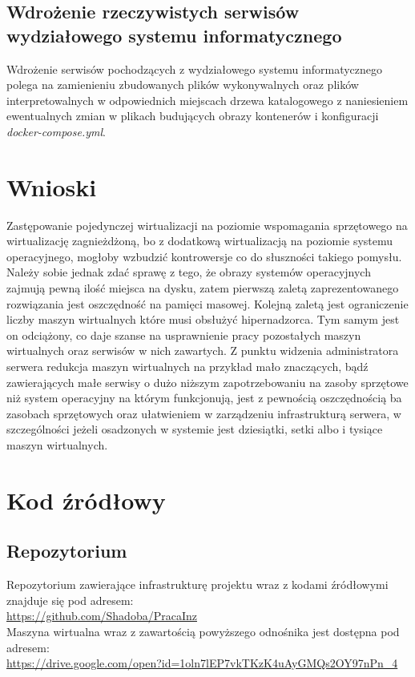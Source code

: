 \documentclass[polish, a4paper, 12pt, oneside]{book}
\begin{document}
	\section{Wdrożenie rzeczywistych serwisów wydziałowego systemu informatycznego}
	Wdrożenie serwisów pochodzących z wydziałowego systemu informatycznego polega na zamienieniu zbudowanych plików wykonywalnych oraz plików interpretowalnych w odpowiednich miejscach drzewa katalogowego z naniesieniem ewentualnych zmian w plikach budujących obrazy kontenerów i konfiguracji \textit{docker-compose.yml}.
	
	\chapter{Wnioski}
	Zastępowanie pojedynczej wirtualizacji na poziomie wspomagania sprzętowego na wirtualizację zagnieżdżoną, bo z dodatkową wirtualizacją na poziomie systemu operacyjnego, mogłoby wzbudzić kontrowersje co do słuszności takiego pomysłu. Należy sobie jednak zdać sprawę z tego, że obrazy systemów operacyjnych zajmują pewną ilość miejsca na dysku, zatem pierwszą zaletą zaprezentowanego rozwiązania jest oszczędność na pamięci masowej. Kolejną zaletą jest ograniczenie liczby maszyn wirtualnych które musi obsłużyć hipernadzorca. Tym samym jest on odciążony, co daje szanse na usprawnienie pracy pozostałych maszyn wirtualnych oraz serwisów w nich zawartych. Z punktu widzenia administratora serwera redukcja maszyn wirtualnych na przykład mało znaczących, bądź zawierających małe serwisy o dużo niższym zapotrzebowaniu na zasoby sprzętowe niż system operacyjny na którym funkcjonują, jest z pewnością oszczędnością ba zasobach sprzętowych oraz ułatwieniem w zarządzeniu infrastrukturą serwera, w szczególności jeżeli osadzonych w systemie jest dziesiątki, setki albo i tysiące maszyn wirtualnych.
	
	
	\chapter{Kod źródłowy}
	
	\section{Repozytorium}
	Repozytorium zawierające infrastrukturę projektu wraz z kodami źródłowymi znajduje się pod adresem:\\
	\url{https://github.com/Shadoba/PracaInz}\\
	Maszyna wirtualna wraz z zawartością powyższego odnośnika jest dostępna pod adresem:\\
	\url{https://drive.google.com/open?id=1oln7lEP7vkTKzK4uAyGMQs2OY97nPn_4}
	
\end{document}
